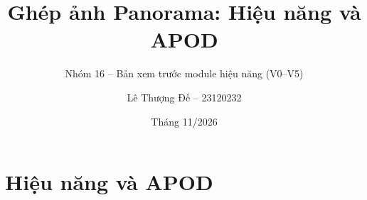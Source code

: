 \documentclass[aspectratio=169]{beamer}
\title{Ghép ảnh Panorama: Hiệu năng và APOD}
\subtitle{Nhóm 16 -- Bản xem trước module hiệu năng (V0--V5)}
\author{Lê Thượng Đế -- 23120232}
\date{Tháng 11/2026}
\begin{document}
\begin{frame}\titlepage\end{frame}
\section{Hiệu năng và APOD}

\end{document}
